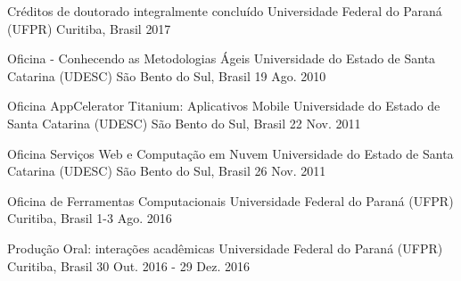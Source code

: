 
\begin{cventries}
	\cventry
	{Créditos de doutorado integralmente concluído} %
	{Universidade Federal do Paraná (UFPR)} %
	{Curitiba, Brasil} %
	{2017} %
	{
	}
\end{cventries}


\begin{cventries}
	\cventry
	{Oficina - Conhecendo as Metodologias Ágeis} %
	{Universidade do Estado de Santa Catarina (UDESC)} %
	{São Bento do Sul, Brasil} %
	{19 Ago. 2010} %
	{}
	
	\cventry
	{Oficina AppCelerator Titanium: Aplicativos Mobile} %
	{Universidade do Estado de Santa Catarina (UDESC)} %
	{São Bento do Sul, Brasil} %
	{22 Nov. 2011} %
	{}
	
	\cventry
	{Oficina Serviços Web e Computação em Nuvem} %
	{Universidade do Estado de Santa Catarina (UDESC)} %
	{São Bento do Sul, Brasil} %
	{26 Nov. 2011} %
	{}
	
	\cventry
	{Oficina de Ferramentas Computacionais} %
	{Universidade Federal do Paraná (UFPR)} %
	{Curitiba, Brasil} %
	{1-3 Ago. 2016} %
	{}
	
	\cventry
	{Produção Oral: interações acadêmicas} %
	{Universidade Federal do Paraná (UFPR)} %
	{Curitiba, Brasil} %
	{30 Out. 2016 - 29 Dez. 2016} %
	{}
\end{cventries}


